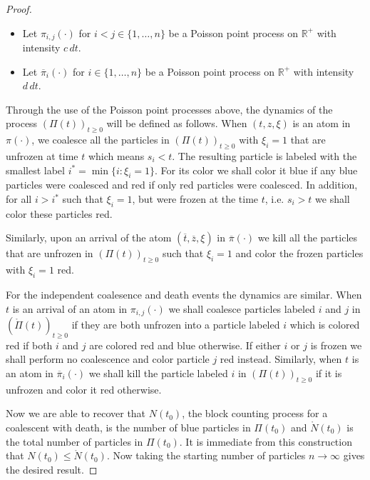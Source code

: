 \documentclass[11pt]{article}
\theoremstyle{definition}
\newcommand{\R}{\mathbb{R}}
\begin{document}
\begin{proof}
\begin{itemize}
        \item Let $\pi_{i,j}(\cdot)$ for $i < j \in \{1, \ldots, n\}$ be a Poisson point process on $\R^+$ with intensity $c\, dt$.
        
        \item Let $\overline{\pi}_{i}(\cdot)$ for $i \in \{1, \ldots, n\}$ be a Poisson point process on $\R^+$ with intensity $d\, dt$.
    \end{itemize}
    
    \noindent Through the use of the Poisson point processes above, the dynamics of the process $(\Pi(t))_{t \geq 0}$ will be defined as follows. When $(t,z, \xi)$ is an atom in $\pi(\cdot)$, we coalesce all the particles in $(\Pi(t))_{t \geq 0}$ with $\xi_i = 1$ that are unfrozen at time $t$ which means $s_i < t$. The resulting particle is labeled with the smallest label $i^* = \min\{i \colon \xi_i = 1\}$. For its color we shall color it blue if any blue particles were coalesced and red if only red particles were coalesced. In addition, for all $i > i^*$ such that $\xi_i = 1$, but were frozen at the time $t$, i.e. $s_i > t$ we shall color these particles red. 
    \medskip
    
    \noindent Similarly, upon an arrival of the atom $(\overline{t}, \overline{z}, \xi)$ in $\overline{\pi}(\cdot)$ we kill all the particles that are unfrozen in $(\Pi(t))_{t \geq 0}$ such that $\xi_i = 1$ and color the frozen particles with $\xi_i = 1$ red. 
    \medskip
    
    \noindent For the independent coalesence and death events the dynamics are similar. When $t$ is an arrival of an atom in $\pi_{i,j}(\cdot)$ we shall coalesce particles labeled $i$ and $j$ in $(\mathring{\Pi}(t))_{t \geq 0}$ if they are both unfrozen into a particle labeled $i$ which is colored red if both $i$ and $j$ are colored red and blue otherwise. If either $i$ or $j$ is frozen we shall perform no coalescence and color particle $j$ red instead. Similarly, when $t$ is an atom in $\overline{\pi}_{i}(\cdot)$ we shall kill the particle labeled $i$ in $(\Pi(t))_{t \geq 0}$ if it is unfrozen and color it red otherwise. 
    \medskip

    \noindent Now we are able to recover that $N(t_0)$, the block counting process for a coalescent with death, is the number of blue particles in $\Pi(t_0)$ and $\mathring{N}(t_0)$ is the total number of particles in $\Pi(t_0)$. It is immediate from this construction that $N(t_0) \leq \mathring{N}(t_0)$. Now taking the starting number of particles $n \to \infty$ gives the desired result.
\end{proof}
\end{document}
